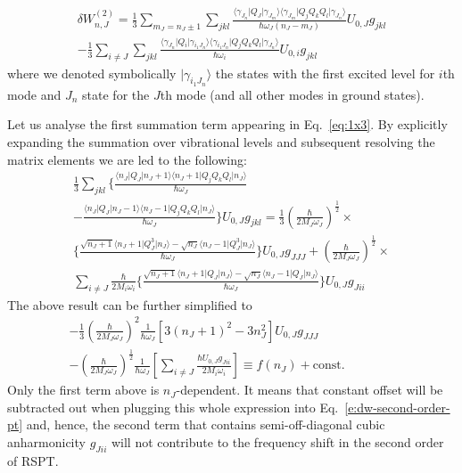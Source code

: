 \documentclass[a4paper,titlepage,twoside,fleqn,12pt]{book}
\begin{document}
\begin{refsection}
\begin{multline}
\delta W_{n,J}^{(2)} =
\frac{1}{3}
\sum_{m_J= n_J \pm 1} 
\sum_{jkl}
\frac{
   \langle \gamma_{J_n} \vert Q_J \vert \gamma_{J_m}          \rangle
   \langle \gamma_{J_m} \vert Q_jQ_kQ_l \vert \gamma_{J_n}    \rangle
}{\hbar \omega_J (n_J-m_J) } U_{0,J} g_{jkl}                    \\
%
- \frac{1}{3}
\sum_{i\ne J}
\sum_{jkl}
\frac{
   \langle \gamma_{J_n} \vert Q_i \vert \gamma_{i_1J_n}        \rangle
   \langle \gamma_{i_1J_n} \vert Q_jQ_kQ_l \vert \gamma_{J_n}  \rangle
}{\hbar \omega_i } U_{0,i} g_{jkl}                    
\qquad
\end{multline}
%
where we denoted symbolically $\vert \gamma_{i_1J_n} \rangle$ the states 
with the first excited level for $i$th mode and $J_n$ state for the $J$th mode
(and all other modes in ground states).

Let us analyse the first summation term appearing in Eq.~\eqref{eq:1x3}.
By explicitly expanding the summation over vibrational levels and subsequent resolving
the matrix elements we are led to the following:
%
\begin{multline}
\frac{1}{3}  \sum_{jkl}
  \Bigg\{ 
   \frac{\langle n_J \vert Q_J \vert n_J+1 \rangle 
         \langle n_J+1 \vert Q_jQ_kQ_l \vert n_J \rangle}{\hbar \omega_J} \\
 - \frac{\langle n_J \vert Q_J \vert n_J-1 \rangle
         \langle n_J-1 \vert Q_jQ_kQ_l \vert n_J \rangle}{\hbar \omega_J}
  \Bigg\}     U_{0,J} g_{jkl} 
= 
\frac{1}{3} \left( \frac{\hbar}{2M_J\omega_J} \right)^\frac{1}{2} \times \\
  \Bigg\{
    \frac{\sqrt{n_J+1}\langle n_J+1 \vert Q_J^3 \vert n_J \rangle - \sqrt{n_J} 
         \langle n_J-1 \vert Q_J^3 \vert n_J \rangle}{\hbar\omega_J} 
  \Bigg\} U_{0,J} g_{JJJ} + \left( \frac{\hbar}{2M_J\omega_J} \right)^\frac{1}{2} \times \\
\sum_{i\ne J} \frac{\hbar}{2M_i\omega_i}
  \Bigg\{
     \frac{\sqrt{n_J+1}\langle n_J+1 \vert Q_J \vert n_J \rangle - \sqrt{n_J}
          \langle n_J-1 \vert Q_J \vert n_J \rangle}{\hbar\omega_J}
  \Bigg\} U_{0,J} g_{Jii}
\end{multline}
%
The above result can be further simplified to
%
\begin{multline}    \label{e:x552}
-\frac{1}{3} \left( \frac{\hbar}{2M_J\omega_J} \right)^2 \frac{1}{\hbar\omega_J} 
           \left[ 3\left( n_J+1 \right)^2 - 3n_J^2 \right] U_{0,J} g_{JJJ} \\ - 
     \left( \frac{\hbar}{2M_J\omega_J} \right)^\frac{1}{2} \frac{1}{\hbar\omega_J}
     \left[ \sum_{i\ne J} \frac{\hbar U_{0,J} g_{Jii}}{2M_i\omega_i} \right]  \equiv 
f(n_J) + \mathrm{const.} \qquad \qquad
\end{multline}
%
Only the first term above is $n_J$-dependent. It means that constant offset will be 
subtracted out when plugging this whole expression into Eq.~\eqref{e:dw-second-order-pt}
and, hence, the second term that contains semi\hyp{}off-diagonal cubic anharmonicity $g_{Jii}$ 
will not contribute to the frequency shift in the second order of RSPT.


\end{refsection}
\end{document}
